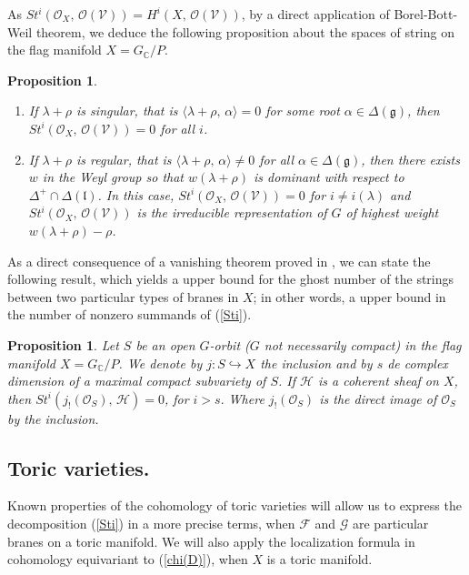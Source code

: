 \documentclass[xypic,amscd,syntonly,amssymb,verbatim,12pt]{amsart}
\theoremstyle{plain}
\newtheorem{Prop}[Thm]{Proposition}
\theoremstyle{definition}
\theoremstyle{remark}
\numberwithin{equation}{section}
\begin{document}
 As $St^i({\mathcal O}_X,\,{\mathcal O}({\mathcal V}))=H^i(X,\,{\mathcal O}({\mathcal V}))$, by a direct application of  Borel-Bott-Weil theorem,
 we deduce the following proposition about the spaces of string on the flag manifold $X=G_{\mathbb C}/P$.
 \begin{Prop}\label{B-B-W}
  \indent
\begin{enumerate}
 \item If $\lambda+\rho$ is singular, that is $\langle\lambda+\rho,\,\alpha\rangle=0$ for some root
 $\alpha\in{\Delta}({\mathfrak g})$,  then $St^i({\mathcal
O}_X,\,{\mathcal O}({\mathcal V}))=0$ for all $i$.
 \item If $\lambda+\rho$ is regular,  that is $\langle\lambda+\rho,\,\alpha\rangle\ne
 0$ for all $\alpha\in{\Delta}({\mathfrak g})$,
 then there exists $w$ in the Weyl group so
 that $w(\lambda+\rho)$ is dominant with respect to
 $\Delta^+\cap\Delta({\mathfrak l})$. In this case,
 $St^i({\mathcal
O}_X,\,{\mathcal O}({\mathcal V}))=0$
 for $i\ne i(\lambda)$ and  $St^i({\mathcal
O}_X,\,{\mathcal O}({\mathcal V}))$ is the irreducible
representation of $G$ of highest weight
 $w(\lambda+\rho)-\rho$.
 \end{enumerate}
\end{Prop}

As a direct consequence of a vanishing theorem proved in
 \cite{S-W}, we can state the following result, which yields a upper bound for the ghost number of the strings
  between two particular types of  branes in $X$;  in other words,
  a upper bound in the number of nonzero summands of (\ref{Sti}).
\begin{Prop}\label{PropSchmWolf}
 Let $S$ be an open $G$-orbit ($G$ not necessarily compact) in the flag manifold $X=G_{\mathbb C}/P$. We denote by $j:S\hookrightarrow X$ the inclusion
  and by $s$ de complex dimension
 of a maximal compact subvariety of $S$. If  ${\mathcal H}$  is a coherent sheaf on
 $X$, then $St^i(j_!({\mathcal O}_S),\,{\mathcal H})=0$, for
 $i>s.$ Where $j_!({\mathcal O}_S)$ is the direct image of
 ${\mathcal O}_S$ by the inclusion.
 \end{Prop}




\subsection{ Toric varieties.}\label{SubsectToric}
 Known properties of the cohomology of toric varieties will allow us to
 express the decomposition (\ref{Sti}) in a more precise terms, when
 ${\mathcal F}$ and ${\mathcal G}$ are particular branes on a
 toric manifold. We will also apply the localization formula in
 cohomology equivariant to (\ref{chi(D)}), when $X$ is a toric
 manifold.
\end{document}
